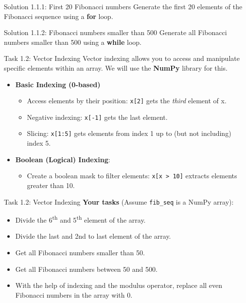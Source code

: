 \begin{frame}[fragile]{Solution 1.1.1: First 20 Fibonacci numbers} 
Generate the first 20 elements of the Fibonacci sequence using a \textbf{for} loop.
\vfill
\small

\end{frame}

\begin{frame}[fragile]{Solution 1.1.2: Fibonacci numbers smaller than 500} 
Generate all Fibonacci numbers smaller than 500 using a \textbf{while} loop.
\vfill
\small

\end{frame}

\begin{frame}[fragile]{Task 1.2: Vector Indexing}
Vector indexing allows you to access and manipulate specific elements within an array. We will use the \textbf{NumPy} library for this.

\begin{itemize}
    \item \textbf{Basic Indexing (0-based)}
    \begin{itemize}
        \item Access elements by their position: \lstinline{x[2]} gets the \textit{third} element of x.
        \item Negative indexing: \lstinline{x[-1]} gets the last element.
        \item Slicing: \lstinline{x[1:5]} gets elements from index 1 up to (but not including) index 5.
    \end{itemize}
    \item \textbf{Boolean (Logical) Indexing}:
    \begin{itemize}
        \item Create a boolean mask to filter elements: \lstinline{x[x > 10]} extracts elements greater than 10.
    \end{itemize}
\end{itemize}
\end{frame}

\begin{frame}{Task 1.2: Vector Indexing}
\textbf{Your tasks} (Assume \texttt{fib\_seq} is a NumPy array):
\begin{itemize}
    \item Divide the 6\textsuperscript{th} and 5\textsuperscript{th} element of the array.
    \item Divide the last and 2nd to last element of the array.
    \item Get all Fibonacci numbers smaller than 50.
     \item Get all Fibonacci numbers between 50 and 500.
    \item With the help of indexing and the modulus operator, replace all even Fibonacci numbers in the array with 0.
\end{itemize}
\end{frame}

